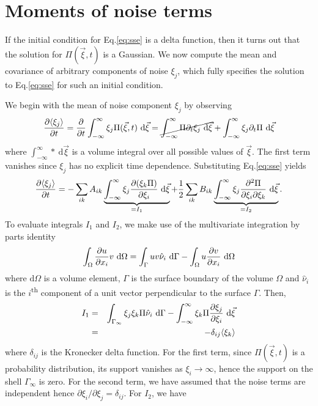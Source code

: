 \documentclass[10pt,letterpaper]{article}
\begin{document}
\section{Moments of noise terms}

\newcommand{\lpi}{\Pi(\vec{\xi},t)}
\newcommand{\intxi}[1]{\int_{-\infty}^{\infty} #1\ \text{d}\vec{\xi}}
If the initial condition for Eq.\eqref{eq:sse} is a delta function, then it turns out that the solution for $\Pi(\vec{\xi},t)$ is a Gaussian\cite{Van92}. We now compute the mean and covariance of arbitrary components of noise $\xi_j$, which fully specifies the solution to Eq.\eqref{eq:sse} for such an initial condition. 

We begin with the mean of noise component $\xi_j$ by observing
\begin{equation}
\pderiv{\langle \xi_j \rangle}{t} = \pderiv{}{t}\intxi{\xi_j \lpi} = \cancel{\intxi{\Pi\partial_t\xi_j}} + \intxi{\xi_j\partial_t\Pi}
\end{equation}
where $\intxi{\ast}$ is a volume integral over all possible values of $\vec{\xi}$. The first term vanishes since $\xi_j$ has no explicit time dependence. Substituting Eq.\eqref{eq:sse} yields
\begin{equation}
\pderiv{\langle \xi_j \rangle}{t} = - \sum_{ik}A_{ik}\underbrace{\intxi{\xi_j\pderiv{(\xi_k\Pi)}{\xi_i}}}_{=I_1} + \frac{1}{2}\sum_{ik}B_{ik}\underbrace{\intxi{\xi_j \pdd{\Pi}{\xi_i}{\xi_k}}}_{=I_2}.
\end{equation}
To evaluate integrals $I_1$ and $I_2$, we make use of the multivariate integration by parts identity
\begin{equation}
\int_\Omega \frac{\partial u}{\partial x_i}v\ \text{d}\Omega = \int_\Gamma uv \hat{\nu}_i\ \text{d}\Gamma - \int_\Omega u \frac{\partial v}{\partial x_i}\ \text{d}\Omega
\end{equation}
where $\text{d}\Omega$ is a volume element, $\Gamma$ is the surface boundary of the volume $\Omega$ and $\hat{\nu}_i$ is the $i$\textsuperscript{th} component of a unit vector perpendicular to the surface $\Gamma$. Then,
\begin{eqnarray}
I_1 &=& \int_{\Gamma_\infty} \xi_j \xi_k  \Pi \hat{\nu}_i\ \text{d}\Gamma - \intxi{\xi_k \Pi \pderiv{\xi_j}{\xi_i}} \nonumber \\
&=& - \delta_{ij} \langle \xi_k \rangle
\end{eqnarray}
where $\delta_{ij}$ is the Kronecker delta function. For the first term, since $\lpi$ is a probability distribution, its support vanishes as $\xi_i \rightarrow \infty$, hence the support on the shell $\Gamma_\infty$ is zero. For the second term, we have assumed that the noise terms are independent hence $\partial \xi_i/\partial \xi_j = \delta_{ij}$. For $I_2$, we have
\end{document}
